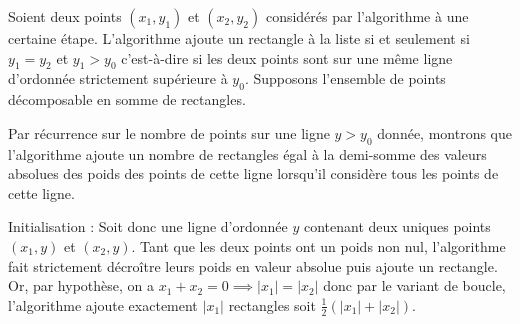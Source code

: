 \begin{center}
\end{center}

Soient deux points $(x_1,y_1)$ et $(x_2,y_2)$ considérés par l'algorithme à une certaine étape. L'algorithme ajoute un rectangle à la liste si et seulement si $y_1=y_2$ et $y_1 > y_0$ c'est-à-dire si les deux points sont sur une même ligne d'ordonnée strictement supérieure à $y_0$. Supposons l'ensemble de points décomposable en somme de rectangles.
\medskip

Par récurrence sur le nombre de points sur une ligne $y>y_0$ donnée, montrons que l'algorithme ajoute un nombre de rectangles égal à la demi-somme des valeurs absolues des poids des points de cette ligne lorsqu'il considère tous les points de cette ligne.
\medskip

Initialisation : Soit donc une ligne d'ordonnée $y$ contenant deux uniques points $(x_1,y)$ et $(x_2,y)$. Tant que les deux points ont un poids non nul, l'algorithme fait strictement décroître leurs poids en valeur absolue puis ajoute un rectangle. Or, par hypothèse, on a $x_1+x_2=0 \implies |x_1|=|x_2|$ donc par le variant de boucle, l'algorithme ajoute exactement $|x_1|$ rectangles soit $\frac{1}{2}(|x_1|+|x_2|)$.
\medskip

